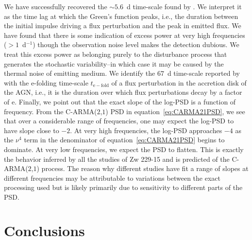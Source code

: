 \documentclass[a4paper,fleqn,usenatbib]{mnras}
\begin{document}
We have successfully recovered the $\sim 5.6$~d time-scale found by \citet{Edelson14}. We interpret it as the time lag at which the Green's function peaks, i.e., the duration between the initial impulse driving a flux perturbation and the peak in emitted flux. We have found that there is some indication of excess power at very high frequencies ($> 1$~d$^{-1}$) though the observation noise level makes the detection dubious. We treat this excess power as belonging purely to the disturbance process that generates the stochastic variability--in which case it may be caused by the thermal noise of emitting medium. We identify the $67$~d time-scale reported by \citet{CariniWilliamsAAS} with the e-folding time-scale $t_{\mathrm{e-fold}}$ of a flux perturbation in the accretion disk of the AGN, i.e., it is the duration over which flux perturbations decay by a factor of $\mathrm{e}$. Finally, we point out that the exact slope of the log-PSD is a function of frequency. From the C-ARMA($2$,$1$) PSD in equation~\eqref{eq:CARMA21PSD}, we see that over a considerable range of frequencies, one may expect the log-PSD to have slope close to $-2$. At very high frequencies, the log-PSD approaches $-4$ as the $\nu^{4}$ term in the denominator of equation~\eqref{eq:CARMA21PSD} begins to dominate. At very low frequencies, we expect the PSD to flatten. This is exactly the behavior inferred by all the studies of Zw 229-15 and is predicted of the C-ARMA($2$,$1$) process. The reason why different studies have fit a range of slopes at different frequencies may be attributable to variations between the exact processing used but is likely primarily due to sensitivity to different parts of the PSD.



\section[Conclusion]{Conclusions}\label{sec:Conclusions}
\end{document}
